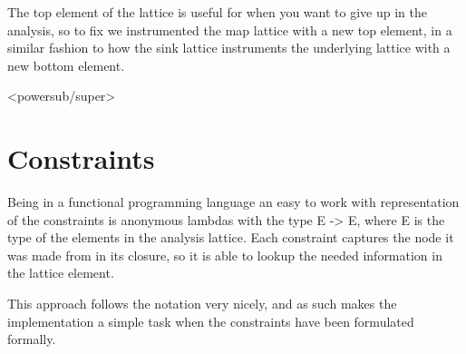The top element of the lattice is useful for when you want to give up in the analysis, so to fix we instrumented the map lattice with a new top element, in a similar fashion to how the sink lattice instruments the underlying lattice with a new bottom element. 

<powersub/super>


\section{Constraints}

Being in a functional programming language an easy to work with representation of the constraints is anonymous lambdas with the type E -> E, where E is the type of the elements in the analysis lattice. Each constraint captures the node it was made from in its closure, so it is able to lookup the needed information in the lattice element.

This approach follows the notation very nicely, and as such makes the implementation a simple task when the constraints have been formulated formally.

